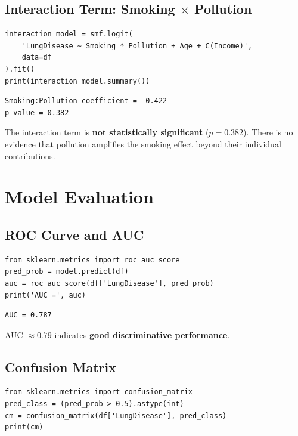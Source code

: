\documentclass[12pt,a4paper]{article}
\begin{document}
\subsection{Interaction Term: Smoking $\times$ Pollution}

\begin{lstlisting}[style=pythonstyle]
interaction_model = smf.logit(
    'LungDisease ~ Smoking * Pollution + Age + C(Income)',
    data=df
).fit()
print(interaction_model.summary())
\end{lstlisting}

\begin{lstlisting}[style=outputstyle]
Smoking:Pollution coefficient = -0.422
p-value = 0.382
\end{lstlisting}

The interaction term is \textbf{not statistically significant} ($p = 0.382$). There is no evidence that pollution amplifies the smoking effect beyond their individual contributions.

\section{Model Evaluation}

\subsection{ROC Curve and AUC}

\begin{lstlisting}[style=pythonstyle]
from sklearn.metrics import roc_auc_score
pred_prob = model.predict(df)
auc = roc_auc_score(df['LungDisease'], pred_prob)
print('AUC =', auc)
\end{lstlisting}

\begin{lstlisting}[style=outputstyle]
AUC = 0.787
\end{lstlisting}

AUC $\approx 0.79$ indicates \textbf{good discriminative performance}.

\subsection{Confusion Matrix}

\begin{lstlisting}[style=pythonstyle]
from sklearn.metrics import confusion_matrix
pred_class = (pred_prob > 0.5).astype(int)
cm = confusion_matrix(df['LungDisease'], pred_class)
print(cm)
\end{lstlisting}
\end{document}
